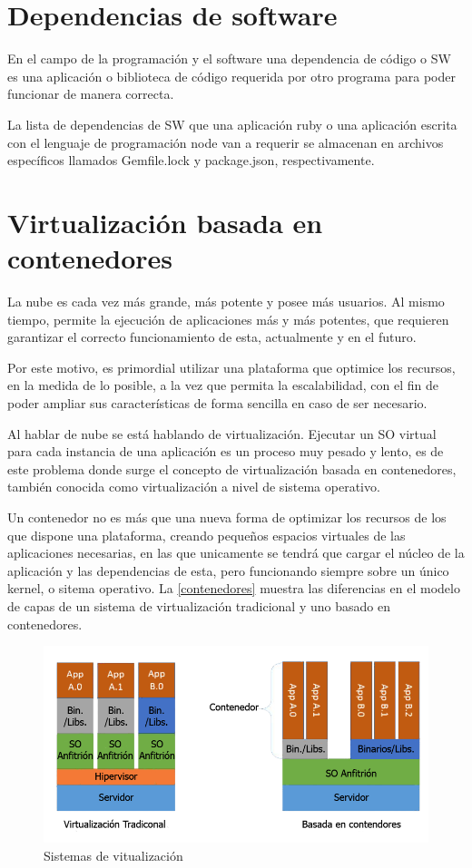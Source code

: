 \section{Dependencias de software}\label{dependencias}

En el campo de la programación y el software una dependencia de código o \gls{SW} es una aplicación o biblioteca de código requerida por otro programa para poder funcionar de manera correcta\cite{wiki2017}.

La lista de dependencias de \gls{SW} que una aplicación ruby o una aplicación escrita con el lenguaje de programación node van a requerir se almacenan en archivos específicos llamados Gemfile.lock y package.json, respectivamente. 

\section{Virtualización basada en contenedores}

La nube es cada vez más grande, más potente y posee más usuarios. Al mismo tiempo, permite la ejecución de aplicaciones más y más potentes, que requieren garantizar el correcto funcionamiento de esta, actualmente y en el futuro.

Por este motivo, es primordial utilizar una plataforma que optimice los recursos, en la medida de lo posible, a la vez que permita la escalabilidad, con el fin de poder ampliar sus características de forma sencilla en caso de ser necesario.

Al hablar de nube se está hablando de virtualización. Ejecutar un \gls{SO} virtual para cada instancia de una aplicación es un proceso muy pesado y lento, es de este problema donde surge el concepto de virtualización basada en contenedores, también conocida como virtualización a nivel de sistema operativo.

Un contenedor no es más que una nueva forma de optimizar los recursos de los que dispone una plataforma, creando pequeños espacios virtuales de las aplicaciones necesarias, en las que unicamente se tendrá que cargar el núcleo de la aplicación y las dependencias de esta, pero funcionando siempre sobre un único kernel, o sitema operativo\cite{velazco2016}. La \autoref{contenedores} muestra las diferencias en el modelo de capas de un sistema de virtualización tradicional y uno basado en contenedores.

\begin{figure}[htbp]
	\centering
	\includegraphics[width=0.8\linewidth]
	{tecnica/figuras/Contenedores.png}
	\caption{Sistemas de vitualización}
	\label{contenedores}
\end{figure}

\endinput